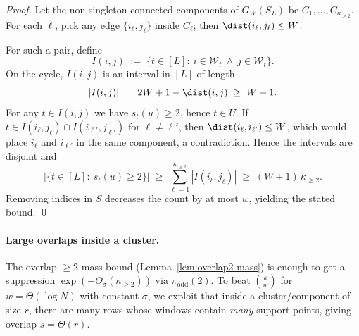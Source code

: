 \begin{proof}
Let the non-singleton connected components of $G_W(S_L)$ be $C_1,\dots,C_{\kappa_{\ge 2}}$.
For each $\ell$, pick any edge $\{i_\ell,j_\ell\}$ inside $C_\ell$; then $\dist(i_\ell,j_\ell)\le W$.

For such a pair, define
\[
I(i,j)\;:=\;\{t\in [L]:\ i\in \mathcal W_t\ \wedge\ j\in \mathcal W_t\}.
\]
On the cycle, $I(i,j)$ is an interval in $[L]$ of length
\[
|I(i,j)| \;=\; 2W+1-\dist(i,j)\;\ge\; W+1.
\]
For any $t\in I(i,j)$ we have $s_t(u)\ge 2$, hence $t\in U$.
If $t\in I(i_\ell,j_\ell)\cap I(i_{\ell'},j_{\ell'})$ for $\ell\neq \ell'$, then $\dist(i_\ell,i_{\ell'})\le W$, which
would place $i_\ell$ and $i_{\ell'}$ in the same component, a contradiction. Hence the intervals are disjoint and
\[
\big|\{t\in [L]:\ s_t(u)\ge 2\}\big|
\;\ge\;
\sum_{\ell=1}^{\kappa_{\ge 2}} |I(i_\ell,j_\ell)|
\;\ge\;
(W+1)\,\kappa_{\ge 2}.
\]
Removing indices in $S$ decreases the count by at most $w$, yielding the stated bound.
\qed
\end{proof}


%
%
%

\paragraph{Large overlaps inside a cluster.}
The overlap-$\ge 2$ mass bound (Lemma~\ref{lem:overlap2-mass}) is enough to get a suppression
$\exp(-\Theta_\sigma(\kappa_{\ge 2}))$ via $\pi_{\mathrm{odd}}(2)$.
To beat $\binom{k}{w}$ for $w=\Theta(\log N)$ with constant $\sigma$, we exploit that inside a cluster/component
of size $r$, there are many rows whose windows contain \emph{many} support points, giving overlap $s=\Theta(r)$.

